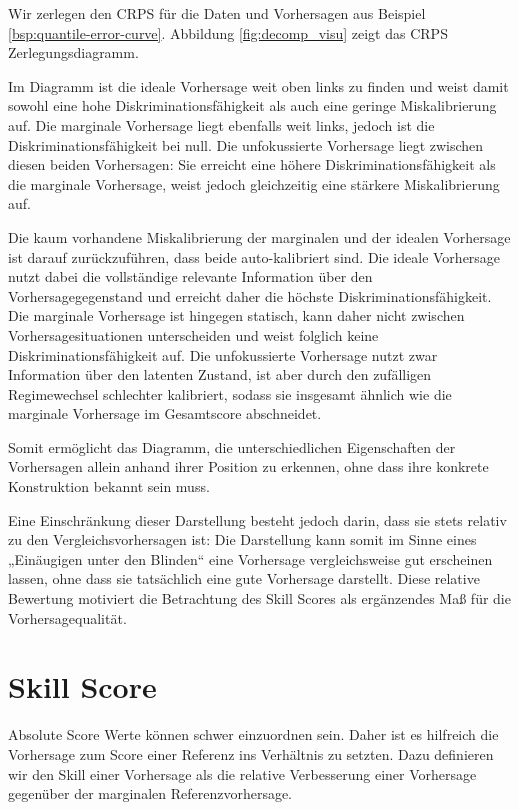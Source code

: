 \begin{bsp} \label{bsp:crps_decomp}
Wir zerlegen den CRPS für die Daten und Vorhersagen aus Beispiel \ref{bsp:quantile-error-curve}. Abbildung \ref{fig:decomp_visu} zeigt das CRPS Zerlegungsdiagramm.

Im Diagramm ist die ideale Vorhersage weit oben links zu finden und weist damit sowohl eine hohe Diskriminationsfähigkeit als auch eine geringe Miskalibrierung auf. Die marginale Vorhersage liegt ebenfalls weit links, jedoch ist die Diskriminationsfähigkeit bei null. Die unfokussierte Vorhersage liegt zwischen diesen beiden Vorhersagen: Sie erreicht eine höhere Diskriminationsfähigkeit als die marginale Vorhersage, weist jedoch gleichzeitig eine stärkere Miskalibrierung auf.

Die kaum vorhandene Miskalibrierung der marginalen und der idealen Vorhersage ist darauf zurückzuführen, dass beide auto-kalibriert sind. Die ideale Vorhersage nutzt dabei die vollständige relevante Information über den Vorhersagegegenstand und erreicht daher die höchste Diskriminationsfähigkeit. Die marginale Vorhersage ist hingegen statisch, kann daher nicht zwischen Vorhersagesituationen unterscheiden und weist folglich keine Diskriminationsfähigkeit auf. Die unfokussierte Vorhersage nutzt zwar Information über den latenten Zustand, ist aber durch den zufälligen Regimewechsel schlechter kalibriert, sodass sie insgesamt ähnlich wie die marginale Vorhersage im Gesamtscore abschneidet.

Somit ermöglicht das Diagramm, die unterschiedlichen Eigenschaften der Vorhersagen allein anhand ihrer Position zu erkennen, ohne dass ihre konkrete Konstruktion bekannt sein muss.
\end{bsp}

Eine Einschränkung dieser Darstellung besteht jedoch darin, dass sie stets relativ zu den Vergleichsvorhersagen ist: Die Darstellung kann somit im Sinne eines „Einäugigen unter den Blinden“ eine Vorhersage vergleichsweise gut erscheinen lassen, ohne dass sie tatsächlich eine gute Vorhersage darstellt. Diese relative Bewertung motiviert die Betrachtung des Skill Scores als ergänzendes Maß für die Vorhersagequalität.


\section{Skill Score} \label{seq:decomp_skill}
Absolute Score Werte können schwer einzuordnen sein. Daher ist es hilfreich die Vorhersage zum Score einer Referenz ins Verhältnis zu setzten. Dazu definieren wir den Skill einer Vorhersage als die relative Verbesserung einer Vorhersage gegenüber der marginalen Referenzvorhersage.

